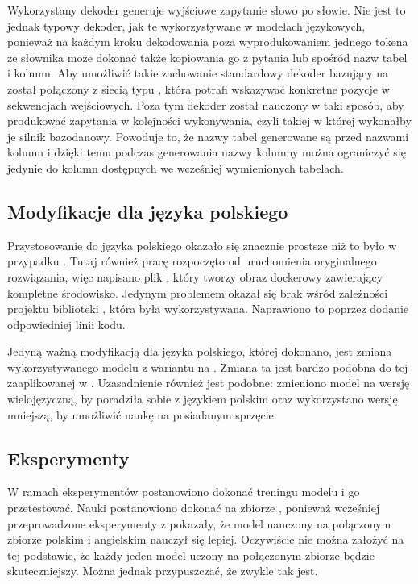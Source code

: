 Wykorzystany dekoder generuje wyjściowe zapytanie słowo po słowie. Nie jest to jednak typowy dekoder, jak te wykorzystywane w modelach językowych, ponieważ na każdym kroku dekodowania poza wyprodukowaniem jednego tokena ze słownika może dokonać także kopiowania go z pytania lub spośród nazw tabel i kolumn. Aby umożliwić takie zachowanie standardowy dekoder bazujący na  został połączony z siecią typu  \cite{Vinyals2015}, która potrafi wskazywać konkretne pozycje w sekwencjach wejściowych. Poza tym dekoder został nauczony w taki sposób, aby produkować zapytania w kolejności wykonywania, czyli takiej w której wykonałby je silnik bazodanowy. Powoduje to, że nazwy tabel generowane są przed nazwami kolumn i dzięki temu podczas generowania nazwy kolumny można ograniczyć się jedynie do kolumn dostępnych we wcześniej wymienionych tabelach.

\subsection{Modyfikacje dla języka polskiego}
Przystosowanie  do języka polskiego okazało się znacznie prostsze niż to było w przypadku . Tutaj również pracę rozpoczęto od uruchomienia oryginalnego rozwiązania, więc napisano plik , który tworzy obraz dockerowy zawierający kompletne środowisko. Jedynym problemem okazał się brak wśród zależności projektu biblioteki , która była wykorzystywana. Naprawiono to poprzez dodanie odpowiedniej linii kodu.

Jedyną ważną modyfikacją dla języka polskiego, której dokonano, jest zmiana wykorzystywanego modelu  z wariantu  na . Zmiana ta jest bardzo podobna do tej zaaplikowanej w . Uzasadnienie również jest podobne: zmieniono model na wersję wielojęzyczną, by poradziła sobie z językiem polskim oraz wykorzystano wersję mniejszą, by umożliwić naukę na posiadanym sprzęcie. 

\subsection{Eksperymenty}
W ramach eksperymentów postanowiono dokonać treningu modelu  i go przetestować. Nauki postanowiono dokonać na zbiorze , ponieważ wcześniej przeprowadzone eksperymenty z  pokazały, że model nauczony na połączonym zbiorze polskim i angielskim nauczył się lepiej. Oczywiście nie można założyć na tej podstawie, że każdy jeden model uczony na połączonym zbiorze będzie skuteczniejszy. Można jednak przypuszczać, że zwykle tak jest.

